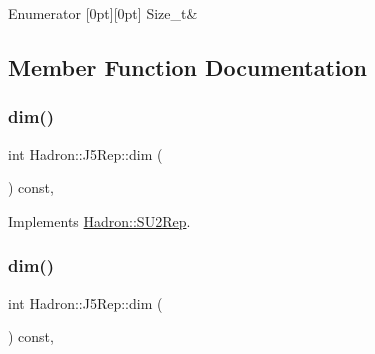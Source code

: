 \begin{DoxyEnumFields}{Enumerator}
[0pt][0pt]{}\mbox{\label{structHadron_1_1J5Rep_a0f98a17d4fdd9263395f110f308934c5a114ac1ed2dab800e721cda73a81aba18}} 
Size\+\_\+t&\\
\hline

\end{DoxyEnumFields}


\subsection{Member Function Documentation}
\mbox{\label{structHadron_1_1J5Rep_a3ae25f39e16107e667d4a57293cea52b}} 
\subsubsection{\texorpdfstring{dim()}{dim()}\hspace{0.1cm}{\footnotesize\ttfamily [1/2]}}
{\footnotesize\ttfamily int Hadron\+::\+J5\+Rep\+::dim (\begin{DoxyParamCaption}{ }\end{DoxyParamCaption}) const\hspace{0.3cm}{\ttfamily [inline]}, {\ttfamily [virtual]}}



Implements \mbox{\hyperlink{structHadron_1_1SU2Rep_a4feae466a054ad829ef37a71b46667b8}{Hadron\+::\+S\+U2\+Rep}}.

\mbox{\label{structHadron_1_1J5Rep_a3ae25f39e16107e667d4a57293cea52b}} 
\subsubsection{\texorpdfstring{dim()}{dim()}\hspace{0.1cm}{\footnotesize\ttfamily [2/2]}}
{\footnotesize\ttfamily int Hadron\+::\+J5\+Rep\+::dim (\begin{DoxyParamCaption}{ }\end{DoxyParamCaption}) const\hspace{0.3cm}{\ttfamily [inline]}, {\ttfamily [virtual]}}



